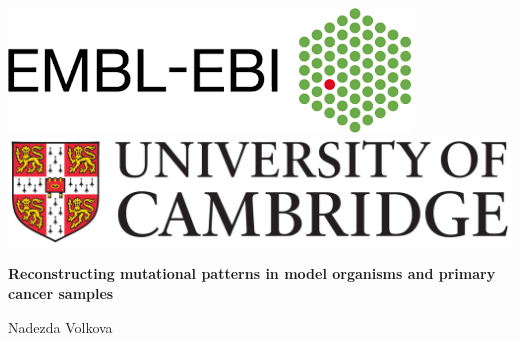 \documentclass[12pt,a4paper,oneside]{article}
\begin{document}
\pagestyle{empty}
\begin{titlepage}
\begin{center}
\includegraphics[scale=0.4]{ebi_logo.png} \thinspace \thinspace \thinspace
\includegraphics[scale=0.6]{uni_cam_logo.jpg}\\[5mm]
\vspace*{20mm}
\sf
\normalsize

\bigskip
{\Huge

  \textbf{Reconstructing mutational patterns in model organisms and primary cancer samples}
}
\bigskip

\vspace*{30mm}

\normalsize
{\Large
Nadezda Volkova
}
\end{center}

\end{titlepage}

\tableofcontents
\newpage{}



\newpage{}



\newpage{}



\newpage{}



\newpage{}



\newpage{}



\newpage{}



\newpage{}



\newpage{}
\end{document}
